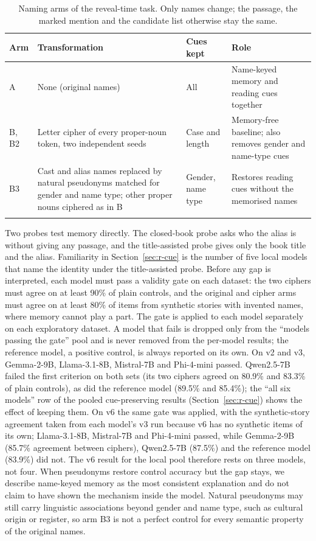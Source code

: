 \documentclass[sn-mathphys]{sn-jnl}%
\theoremstyle{thmstyleone}%
\theoremstyle{thmstyletwo}%
\theoremstyle{thmstylethree}%
\begin{document}
\begin{table}[!t]
\caption{Naming arms of the reveal-time task. Only names change; the passage, the marked mention and the candidate list otherwise stay the same.}\label{tab:arms}
\footnotesize
\begin{tabular*}{\textwidth}{@{\extracolsep\fill}p{1.0cm}p{4.2cm}p{3.0cm}p{3.3cm}}
\toprule
Arm & Transformation & Cues kept & Role \\
\midrule
A & None (original names) & All & Name-keyed memory and reading cues together \\
B, B2 & Letter cipher of every proper-noun token, two independent seeds & Case and length & Memory-free baseline; also removes gender and name-type cues \\
B3 & Cast and alias names replaced by natural pseudonyms matched for gender and name type; other proper nouns ciphered as in B & Gender, name type & Restores reading cues without the memorised names \\
\botrule
\end{tabular*}
\end{table}

Two probes test memory directly. The closed-book probe asks who the alias is without giving any passage, and the title-assisted probe gives only the book title and the alias. Familiarity in Section~\ref{sec:r-cue} is the number of five local models that name the identity under the title-assisted probe. Before any gap is interpreted, each model must pass a validity gate on each dataset: the two ciphers must agree on at least 90\% of plain controls, and the original and cipher arms must agree on at least 80\% of items from synthetic stories with invented names, where memory cannot play a part. The gate is applied to each model separately on each exploratory dataset. A model that fails is dropped only from the ``models passing the gate'' pool and is never removed from the per-model results; the reference model, a positive control, is always reported on its own. On v2 and v3, Gemma-2-9B, Llama-3.1-8B, Mistral-7B and Phi-4-mini passed. Qwen2.5-7B failed the first criterion on both sets (its two ciphers agreed on 80.9\% and 83.3\% of plain controls), as did the reference model (89.5\% and 85.4\%); the ``all six models'' row of the pooled cue-preserving results (Section~\ref{sec:r-cue}) shows the effect of keeping them. On v6 the same gate was applied, with the synthetic-story agreement taken from each model's v3 run because v6 has no synthetic items of its own; Llama-3.1-8B, Mistral-7B and Phi-4-mini passed, while Gemma-2-9B (85.7\% agreement between ciphers), Qwen2.5-7B (87.5\%) and the reference model (83.9\%) did not. The v6 result for the local pool therefore rests on three models, not four. When pseudonyms restore control accuracy but the gap stays, we describe name-keyed memory as the most consistent explanation and do not claim to have shown the mechanism inside the model. Natural pseudonyms may still carry linguistic associations beyond gender and name type, such as cultural origin or register, so arm B3 is not a perfect control for every semantic property of the original names.
\end{document}
